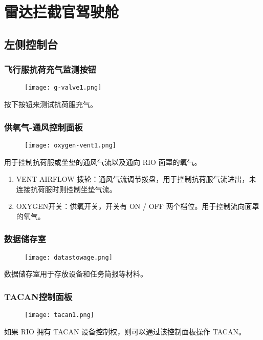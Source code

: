 \section{雷达拦截官驾驶舱}

\subsection{左侧控制台}

\subsubsection{飞行服抗荷充气监测按钮}
\begin{figure}[htb]
  \center
  \texttt{[image: g-valve1.png]}
\end{figure}
按下按钮来测试抗荷服充气。

\subsubsection{供氧气-通风控制面板}
\begin{figure}[htb]
  \center
  \texttt{[image: oxygen-vent1.png]}
\end{figure}
用于控制抗荷服或坐垫的通风气流以及通向 RIO 面罩的氧气。

\begin{enumerate}
  \item VENT AIRFLOW 拨轮：通风气流调节拨盘，用于控制抗荷服气流进出，未连接抗荷服时则控制坐垫气流。
  \item OXYGEN开关：供氧开关，开关有 ON / OFF 两个档位。用于控制流向面罩的氧气。
\end{enumerate}

\subsubsection{数据储存室}
\begin{figure}[htb]
  \center
  \texttt{[image: datastowage.png]}
\end{figure}
数据储存室用于存放设备和任务简报等材料。

\subsubsection{TACAN控制面板}
\begin{figure}[htb]
  \center
  \texttt{[image: tacan1.png]}
\end{figure}
如果 RIO 拥有 TACAN 设备控制权，则可以通过该控制面板操作 TACAN。

